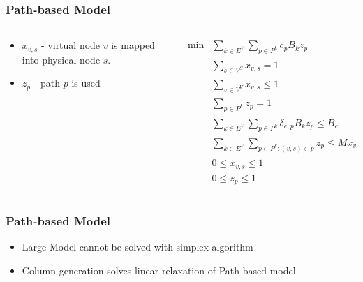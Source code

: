 \documentclass[english]{beamer}
\begin{document}
\begin{frame}
\frametitle{Path-based Model}
{
\begin{columns}
\begin{column}{0.35\textwidth}
  \begin{itemize}
    \item $x_{v,s}$ - virtual node $v$ is mapped into physical node $s$.
    \item $z_{p}$ - path $p$ is used
  \end{itemize}
\end{column}
\pause
\begin{column}{0.45\textwidth}
\tiny
\begin{align}
  \min  & \sum\limits_{k \in E^{V}}\sum\limits_{p \in P^k}  c_{p} B_k z_{p} \nonumber \\
        & \sum\limits_{s \in V^{S}} x_{v,s} = 1                                  & \forall v \in V^{V} \nonumber  \\
        & \sum\limits_{v \in V^{V}} x_{v,s} \leq 1                               & \forall s \in V^{S} \nonumber \\
        & \sum\limits_{p \in P^{k}} z_{p} = 1                                    & \forall k \in E^{V} \nonumber \\
        & \sum\limits_{k \in E^{V}}\sum\limits_{p \in P^{k}} \delta_{e,p} B_{k} z_{p} \leq B_{e} & \forall e \in E^{S} \nonumber \\
        &  \sum\limits_{k \in E^{V}}\sum\limits_{p \in P^k : (v,s) \in p} z_{p} \leq M x_{v,s} & \forall v \in V^{V}, s \in V^{S} \nonumber\\
        & 0 \leq x_{v,s} \leq 1  & \forall v \in V^{V}, s \in V^{S} \nonumber \\
        & 0 \leq z_{p}   \leq 1  & \forall p \in {P} \nonumber
\end{align}
\end{column}
\end{columns}
}
\end{frame}
\begin{frame}
  \frametitle{Path-based Model}
  \begin{itemize}
    \item Large Model cannot be solved with simplex algorithm
    \item Column generation solves linear relaxation of Path-based model
  \end{itemize}
\end{frame}
\end{document}
